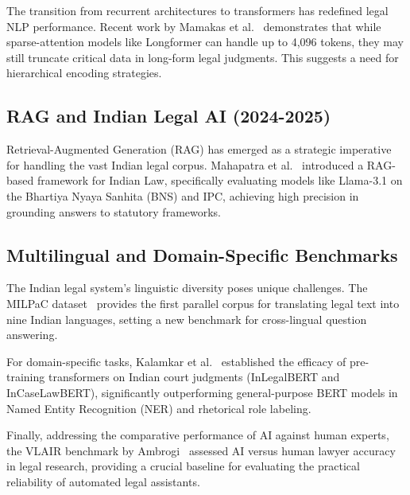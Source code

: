 \documentclass{llncs}
\begin{document}
The transition from recurrent architectures to transformers has redefined legal NLP performance. Recent work by Mamakas et al.~\cite{mamakas2025processing} demonstrates that while sparse-attention models like Longformer can handle up to 4,096 tokens, they may still truncate critical data in long-form legal judgments. This suggests a need for hierarchical encoding strategies. 

\subsection{RAG and Indian Legal AI (2024-2025)}

Retrieval-Augmented Generation (RAG) has emerged as a strategic imperative for handling the vast Indian legal corpus. Mahapatra et al.~\cite{mahapatra2025redefining} introduced a RAG-based framework for Indian Law, specifically evaluating models like Llama-3.1 on the Bhartiya Nyaya Sanhita (BNS) and IPC, achieving high precision in grounding answers to statutory frameworks. 

\subsection{Multilingual and Domain-Specific Benchmarks}

The Indian legal system's linguistic diversity poses unique challenges. The MILPaC dataset~\cite{milpac2025} provides the first parallel corpus for translating legal text into nine Indian languages, setting a new benchmark for cross-lingual question answering. 

For domain-specific tasks, Kalamkar et al.~\cite{kalamkar2022ner} established the efficacy of pre-training transformers on Indian court judgments (InLegalBERT and InCaseLawBERT), significantly outperforming general-purpose BERT models in Named Entity Recognition (NER) and rhetorical role labeling.

Finally, addressing the comparative performance of AI against human experts, the VLAIR benchmark by Ambrogi~\cite{vlair2025} assessed AI versus human lawyer accuracy in legal research, providing a crucial baseline for evaluating the practical reliability of automated legal assistants.
\end{document}
